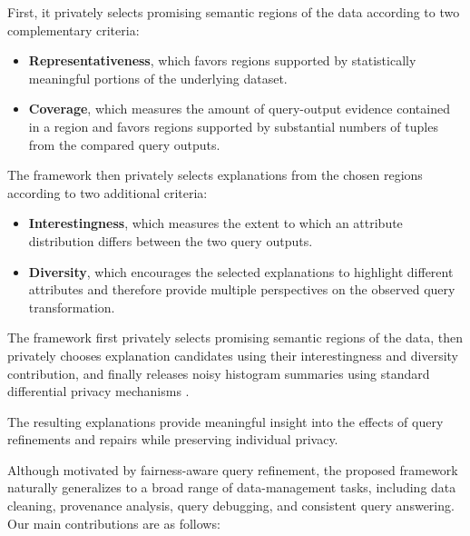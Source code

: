 First, it privately selects promising semantic regions of the
data according to two complementary criteria:

\begin{itemize}

\item \textbf{Representativeness},
which favors regions supported by statistically meaningful
portions of the underlying dataset.

\item \textbf{Coverage},
which measures the amount of query-output evidence contained in
a region and favors regions supported by substantial numbers of
tuples from the compared query outputs.

\end{itemize}

The framework then privately selects explanations from the chosen
regions according to two additional criteria:

\begin{itemize}

\item \textbf{Interestingness},
which measures the extent to which an attribute distribution
differs between the two query outputs.

\item \textbf{Diversity},
which encourages the selected explanations to highlight different
attributes and therefore provide multiple perspectives on the
observed query transformation.

\end{itemize}

The framework first privately selects promising semantic regions
of the data, then privately chooses explanation candidates using
their interestingness and diversity contribution, and finally
releases noisy histogram summaries using standard differential
privacy mechanisms \cite{TheAlgFoundDP2014}.

The resulting explanations provide meaningful insight into the
effects of query refinements and repairs while preserving
individual privacy.

Although motivated by fairness-aware query refinement, the
proposed framework naturally generalizes to a broad range of
data-management tasks, including data cleaning, provenance
analysis, query debugging, and consistent query answering.
Our main contributions are as follows:

